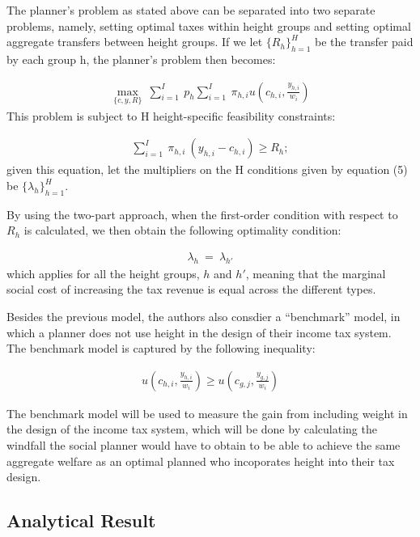 \documentclass[titlepage]{\econtex}
\begin{document}
 The planner's problem as stated above can be separated into two separate problems, namely, setting optimal taxes within height groups and setting optimal aggregate transfers between height groups. If we let $\{R_h\}_{h=1}^H$ be the transfer paid by each group h, the planner's problem then becomes:

  \begin{align}
   \max_{\{c,y,R\}}~ \sum_{i=1}^I \ p_{h} \sum_{i=1}^I \ \pi_{h,i} u\left(c_{h,i}, \frac{y_{h,i}}{w_i}\right)
 \end{align}
 This problem is subject to H height-specific feasibility constraints:

   \begin{align}
    \sum_{i=1}^I \ \pi_{h,i} \ (y_{h,i} - c_{h,i}) \geq R_h ;
 \end{align}
 given this equation, let the multipliers on the H conditions given by equation (5) be $\{\lambda_h\}_{h=1}^H$.

 By using the two-part approach, when the first-order condition with respect to $R_h$ is calculated, we then obtain the following optimality condition:

   \begin{align}
    \lambda_h \ = \ \lambda_{h'}
   \end{align} 
   which applies for all the height groups, $h$ and $h'$, meaning that the marginal social cost of increasing the tax revenue is equal across the different types.

   Besides the previous model, the authors also consdier a ``benchmark'' model, in which a planner does not use height in the design of their income tax system. The benchmark model is captured by the following inequality:

    \begin{align}
     u\left(c_{h,i}, \frac{y_{h,i}}{w_i}\right) \geq u\left(c_{g,j}, \frac{y_{g,j}}{w_i}\right)
    \end{align}

    The benchmark model will be used to measure the gain from including weight in the design of the income tax system, which will be done by calculating the windfall the social planner would have to obtain to be able to achieve the same aggregate welfare as an optimal planned who incoporates height into their tax design.
 
\hypertarget{Analytical Result}{}
\subsection{Analytical Result}
\end{document}
